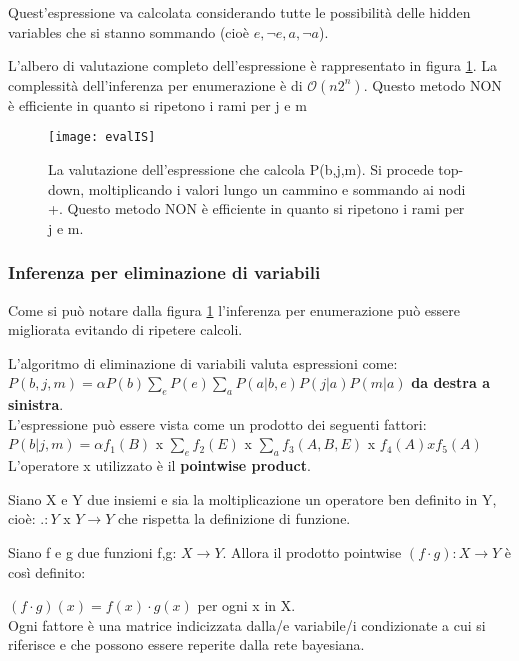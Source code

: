 Quest'espressione va calcolata considerando tutte le possibilità delle
hidden variables che si stanno sommando (cioè $e, \neg e, a, \neg a$).

L'albero di valutazione completo dell'espressione è rappresentato in figura
\ref{fig:evalIS}. La complessità dell'inferenza per enumerazione è di
$\mathcal{O}(n2^n)$. Questo metodo NON è efficiente in quanto si ripetono i
rami per j e m

\begin{figure}[H]
\centering
\texttt{[image: evalIS]}
\caption{La valutazione dell'espressione che calcola P(b,j,m). Si procede
top-down, moltiplicando i valori lungo un cammino e sommando ai nodi +.
Questo metodo NON è efficiente in quanto si ripetono i rami per j e m.}
\label{fig:evalIS}
\end{figure}

\subsubsection{Inferenza per eliminazione di variabili}

Come si può notare dalla figura \ref{fig:evalIS} l'inferenza per
enumerazione può essere migliorata evitando di ripetere calcoli.

L'algoritmo di eliminazione di variabili valuta espressioni come:\\

$P(b,j,m) = \alpha P(b) \sum_e P(e) \sum_a P(a|b,e)P(j|a)P(m|a)$
\textbf{da destra a sinistra}.\\

L'espressione può essere vista come un prodotto dei seguenti fattori:\\

$P(b|j,m) = \alpha f_1(B)$ x $\sum_e f_2(E)$ x $\sum_a f_3(A,B,E)$ x $f_4(A)
x f_5(A)$\\

L'operatore x utilizzato è il \textbf{pointwise product}.

Siano X e Y due insiemi e sia la moltiplicazione un operatore ben
definito in Y, cioè: $. : Y$ x $Y \rightarrow Y$ che rispetta la
definizione di funzione.

Siano f e g due funzioni f,g: $X \rightarrow Y$. Allora il prodotto
pointwise $(f\cdot g): X \rightarrow Y$ è così definito:

$(f\cdot g)(x) = f(x)\cdot g(x)$ per ogni x in X.\\
 
Ogni fattore è una matrice indicizzata dalla/e variabile/i condizionate a
cui si riferisce e che possono essere reperite dalla rete bayesiana.\\

